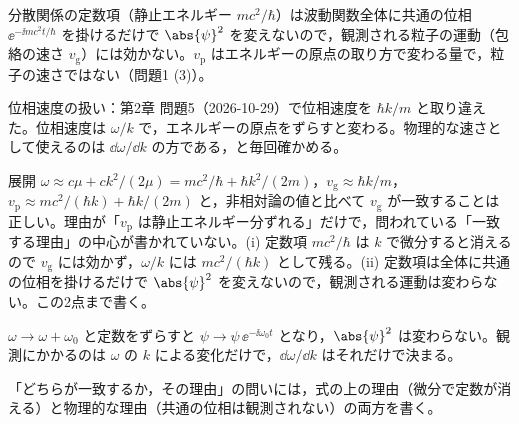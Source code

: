 \begin{daiji}
  \item 分散関係の定数項（静止エネルギー $mc^{2}/\hbar$）は波動関数全体に共通の位相 $\ee^{-\ii mc^{2}t/\hbar}$ を掛けるだけで $\abs{\psi}^{2}$ を変えないので，観測される粒子の運動（包絡の速さ $v_{\mathrm{g}}$）には効かない。$v_{\mathrm{p}}$ はエネルギーの原点の取り方で変わる量で，粒子の速さではない（問題1 (3)）。
\end{daiji}
\begin{maemo}
  \item 位相速度の扱い：第2章 問題5（2026-10-29）で位相速度を $\hbar k/m$ と取り違えた。位相速度は $\omega/k$ で，エネルギーの原点をずらすと変わる。物理的な速さとして使えるのは $\dd\omega/\dd k$ の方である，と毎回確かめる。
\end{maemo}
\begin{kotaeran}
   展開 $\omega\approx c\mu+ck^{2}/(2\mu)=mc^{2}/\hbar+\hbar k^{2}/(2m)$，$v_{\mathrm{g}}\approx\hbar k/m$，$v_{\mathrm{p}}\approx mc^{2}/(\hbar k)+\hbar k/(2m)$ と，非相対論の値と比べて $v_{\mathrm{g}}$ が一致することは正しい。理由が「$v_{\mathrm{p}}$ は静止エネルギー分ずれる」だけで，問われている「一致する理由」の中心が書かれていない。(i) 定数項 $mc^{2}/\hbar$ は $k$ で微分すると消えるので $v_{\mathrm{g}}$ には効かず，$\omega/k$ には $mc^{2}/(\hbar k)$ として残る。(ii) 定数項は全体に共通の位相を掛けるだけで $\abs{\psi}^{2}$ を変えないので，観測される運動は変わらない。この2点まで書く。
\end{kotaeran}
\begin{rikai}
  \item $\omega\to\omega+\omega_{0}$ と定数をずらすと $\psi\to\psi\,\ee^{-\ii\omega_{0}t}$ となり，$\abs{\psi}^{2}$ は変わらない。観測にかかるのは $\omega$ の $k$ による変化だけで，$\dd\omega/\dd k$ はそれだけで決まる。
  \item 「どちらが一致するか，その理由」の問いには，式の上の理由（微分で定数が消える）と物理的な理由（共通の位相は観測されない）の両方を書く。
\end{rikai}
